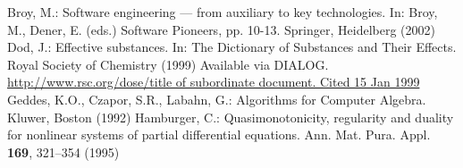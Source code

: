 % 
% 
%

\begin{thebibliography}{99.}%
	 Broy, M.: Software engineering --- from auxiliary to key technologies. In: Broy, M., Dener, E. (eds.) Software Pioneers, pp. 10-13. Springer, Heidelberg (2002)
	 Dod, J.: Effective substances. In: The Dictionary of Substances and Their Effects. Royal Society of Chemistry (1999) Available via DIALOG. \\
	\url{http://www.rsc.org/dose/title of subordinate document. Cited 15 Jan 1999}
	 Geddes, K.O., Czapor, S.R., Labahn, G.: Algorithms for Computer Algebra. Kluwer, Boston (1992)
	 Hamburger, C.: Quasimonotonicity, regularity and duality for nonlinear systems of partial differential equations. Ann. Mat. Pura. Appl. \textbf{169}, 321--354 (1995)
\end{thebibliography}
